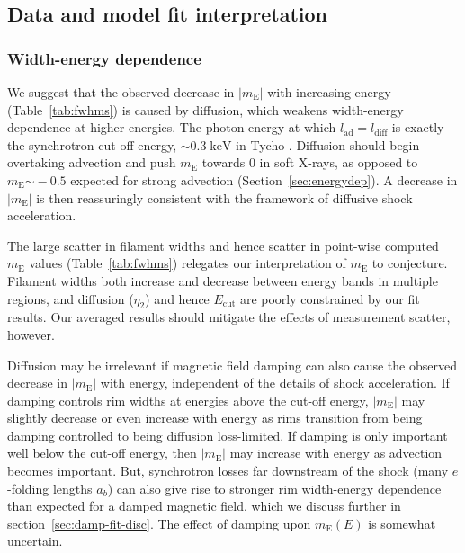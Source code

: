 \documentclass[iop, apj, numberedappendix]{emulateapj}
\newcommand*{\mt}{\mathrm}
\newcommand*{\unit}[1]{\;\mt{#1}}  %
\newcommand*{\abt}{\mathord{\sim}} %
\newcommand*{\mE}{m_\mt{E}}
\newcommand*{\Ecut}{E_{\mt{cut}}}
\begin{document}
\subsection{Data and model fit interpretation}

\subsubsection{Width-energy dependence}

We suggest that the observed decrease in $|\mE|$ with increasing energy
(Table~\ref{tab:fwhms}) is caused by diffusion, which weakens width-energy
dependence at higher energies.  The photon energy at which $l_{\mt{ad}} =
l_{\mt{diff}}$ is exactly the synchrotron cut-off energy,
$\abt 0.3 \unit{keV}$ in Tycho \citep{hwang2002}.  Diffusion should begin
overtaking advection and push $\mE$ towards $0$ in soft X-rays, as opposed to
$\mE \abt -0.5$ expected for strong advection (Section~\ref{sec:energydep}).  A
decrease in $|\mE|$ is then reassuringly consistent with the framework of
diffusive shock acceleration.

The large scatter in filament widths and hence scatter in point-wise computed
$\mE$ values (Table~\ref{tab:fwhms}) relegates our interpretation of $\mE$ to
conjecture.  Filament widths both increase and decrease between energy bands in
multiple regions, and diffusion ($\eta_2$) and hence $\Ecut$ are poorly
constrained by our fit results.  Our averaged results should mitigate the
effects of measurement scatter, however.

Diffusion may be irrelevant if magnetic field damping can also cause the
observed decrease in $|\mE|$ with energy, independent of the details of shock
acceleration.  If damping controls rim widths at energies above the cut-off
energy, $|\mE|$ may slightly decrease or even increase with energy as rims
transition from being damping controlled to being diffusion loss-limited.  If
damping is only important well below the cut-off energy, then $|\mE|$ may
increase with energy as advection becomes important.  But, synchrotron
losses far downstream of the shock (many $e$-folding lengths $a_b$) can also
give rise to stronger rim width-energy dependence than expected for a damped
magnetic field, which we discuss further in section~\ref{sec:damp-fit-disc}.
The effect of damping upon $\mE(E)$ is somewhat uncertain.
\end{document}
